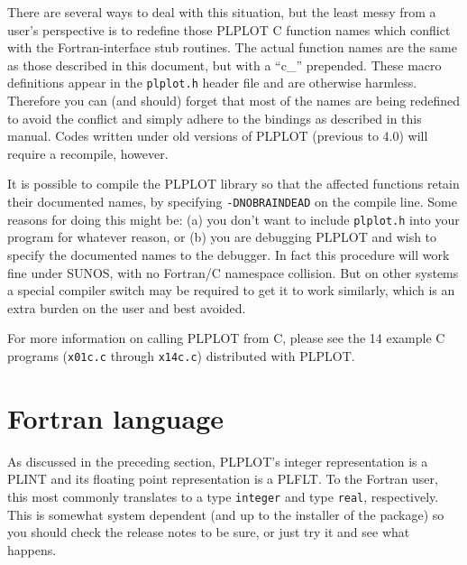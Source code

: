 There are several ways to deal with this situation, but the least messy from
a user's perspective is to redefine those PLPLOT C function names which
conflict with the Fortran-interface stub routines.  The actual function
names are the same as those described in this document, but with a ``c\_''
prepended.  These macro definitions appear in the {\tt plplot.h} header file
and are otherwise harmless.  Therefore you can (and should) forget that most
of the names are being redefined to avoid the conflict and simply adhere to
the bindings as described in this manual.  Codes written under old versions
of PLPLOT (previous to 4.0) will require a recompile, however.

It is possible to compile the PLPLOT library so that the affected functions
retain their documented names, by specifying {\tt -DNOBRAINDEAD} on the
compile line.  Some reasons for doing this might be:  (a) you don't want to
include {\tt plplot.h} into your program for whatever reason, or (b) you are
debugging PLPLOT and wish to specify the documented names to the debugger.
In fact this procedure will work fine under SUNOS, with no Fortran/C
namespace collision.  But on other systems a special compiler switch may be
required to get it to work similarly, which is an extra burden on the user
and best avoided.

For more information on calling PLPLOT from C, please see the 14 example C
programs ({\tt x01c.c} through {\tt x14c.c}) distributed with PLPLOT.

\section {Fortran language}

As discussed in the preceding section, PLPLOT's integer representation is a
PLINT and its floating point representation is a PLFLT.  To the
Fortran user, this most commonly translates to a type {\tt integer} and
type {\tt real}, respectively.  This is somewhat system dependent (and up to
the installer of the package) so you should check the release notes to be
sure, or just try it and see what happens.

